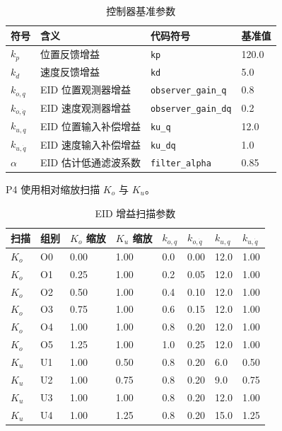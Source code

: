 \documentclass[12pt,a4paper]{ctexart}
\begin{document}
\begin{table}[htbp]
\centering
\footnotesize
\caption{控制器基准参数}
\begin{tabularx}{\textwidth}{YYYY}
\toprule
符号 & 含义 & 代码符号 & 基准值 \\
\midrule
$k_p$ & 位置反馈增益 & \texttt{kp} & 120.0 \\
$k_d$ & 速度反馈增益 & \texttt{kd} & 5.0 \\
$k_{o,q}$ & EID 位置观测器增益 & \texttt{observer\_gain\_q} & 0.8 \\
$k_{o,\dot q}$ & EID 速度观测器增益 & \texttt{observer\_gain\_dq} & 0.2 \\
$k_{u,q}$ & EID 位置输入补偿增益 & \texttt{ku\_q} & 12.0 \\
$k_{u,\dot q}$ & EID 速度输入补偿增益 & \texttt{ku\_dq} & 1.0 \\
$\alpha$ & EID 估计低通滤波系数 & \texttt{filter\_alpha} & 0.85 \\
\bottomrule
\end{tabularx}
\end{table}


P4 使用相对缩放扫描 $K_o$ 与 $K_u$。

\begin{table}[htbp]
\centering
\footnotesize
\caption{EID 增益扫描参数}
\begin{tabularx}{\textwidth}{YYYYYYYY}
\toprule
扫描 & 组别 & $K_o$ 缩放 & $K_u$ 缩放 & $k_{o,q}$ & $k_{o,\dot q}$ & $k_{u,q}$ & $k_{u,\dot q}$ \\
\midrule
$K_o$ & O0 & 0.00 & 1.00 & 0.0 & 0.00 & 12.0 & 1.00 \\
$K_o$ & O1 & 0.25 & 1.00 & 0.2 & 0.05 & 12.0 & 1.00 \\
$K_o$ & O2 & 0.50 & 1.00 & 0.4 & 0.10 & 12.0 & 1.00 \\
$K_o$ & O3 & 0.75 & 1.00 & 0.6 & 0.15 & 12.0 & 1.00 \\
$K_o$ & O4 & 1.00 & 1.00 & 0.8 & 0.20 & 12.0 & 1.00 \\
$K_o$ & O5 & 1.25 & 1.00 & 1.0 & 0.25 & 12.0 & 1.00 \\
$K_u$ & U1 & 1.00 & 0.50 & 0.8 & 0.20 & 6.0 & 0.50 \\
$K_u$ & U2 & 1.00 & 0.75 & 0.8 & 0.20 & 9.0 & 0.75 \\
$K_u$ & U3 & 1.00 & 1.00 & 0.8 & 0.20 & 12.0 & 1.00 \\
$K_u$ & U4 & 1.00 & 1.25 & 0.8 & 0.20 & 15.0 & 1.25 \\
\bottomrule
\end{tabularx}
\end{table}
\end{document}
